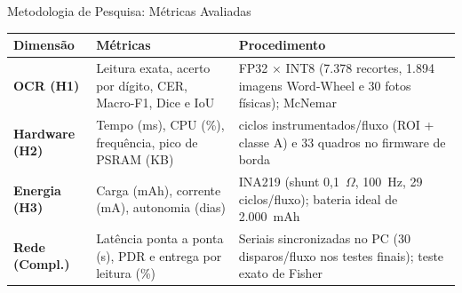 \documentclass[
    aspectratio=169,
    11pt,
    brazil
]{beamer}
\begin{document}
\begin{frame}{Metodologia de Pesquisa: Métricas Avaliadas}
  \centering
  \scriptsize
  \renewcommand{\arraystretch}{1.25}
  \begin{tabular}{@{}l >{\raggedright\arraybackslash}p{4.3cm} >{\raggedright\arraybackslash}p{6.8cm}@{}}
    \toprule
    \textbf{Dimensão} & \textbf{Métricas} & \textbf{Procedimento} \\
    \midrule
    \textbf{\color{senacorange}OCR (H1)} & Leitura exata, acerto por dígito, CER, Macro-F1, Dice e IoU
      & FP32 $\times$ INT8 (7.378 recortes, 1.894 imagens Word-Wheel e 30 fotos físicas); McNemar \\
    \textbf{\color{senacorange}Hardware (H2)} & Tempo (ms), CPU (\%), frequência, pico de PSRAM (KB)
      & 30 ciclos instrumentados/fluxo (ROI + classe A) e 33 quadros no firmware de borda \\
    \textbf{\color{senacorange}Energia (H3)} & Carga (mAh), corrente (mA), autonomia (dias)
      & INA219 (shunt 0,1~$\Omega$, 100~Hz, 29 ciclos/fluxo); bateria ideal de 2.000~mAh \\
    \textbf{\color{senacorange}Rede (Compl.)} & Latência ponta a ponta (s), PDR e entrega por leitura (\%)
      & Seriais sincronizadas no PC (30 disparos/fluxo nos testes finais); teste exato de Fisher \\
    \bottomrule
  \end{tabular}
\end{frame}
\end{document}
